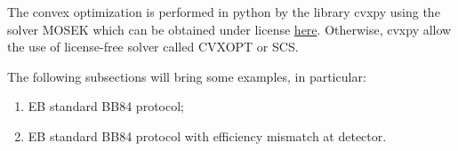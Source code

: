 \documentclass{article}
\begin{document}
    The convex optimization is performed in python by the library \textrm{cvxpy} using the solver \textrm{MOSEK} which can be obtained under license \href{https://www.mosek.com/products/academic-licenses/}{here}.
    Otherwise, \textrm{cvxpy} allow the use of license-free solver called \textrm{CVXOPT} or \textrm{SCS}.

    The following subsections will bring some examples, in particular:
    \begin{enumerate}
        \item EB standard BB84 protocol;
        \item EB standard BB84 protocol with efficiency mismatch at detector.
    \end{enumerate}
\end{document}
